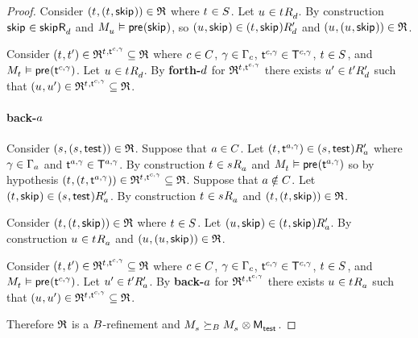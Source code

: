 \begin{proof}
Consider $(\kStateT, (\kStateT, \aStateSkip)) \in \refinement$ where $\kStateT \in \kStates$.
Let $\kStateU \in \kSuccessorsD{\kStateT}$.
By construction $\aStateSkip \in \aSuccessorsD{\aStateSkip}$ and $\kPModel{\kStateU} \entails \aPrecondition(\aStateSkip)$, so $(\kStateU, \aStateSkip) \in \kSuccessorsPD{(\kStateT, \aStateSkip)}$ and $(\kStateU, (\kStateU, \aStateSkip)) \in \refinement$.

Consider $(\kStateT, \kStateTP) \in \refinement^{\kStateT, \aStateT[\agentC, \gamma]} \subseteq \refinement$ where $\agentC \in \agentsC$, $\gamma \in \Gamma_\agentC$, $\aStateT[\agentC, \gamma] \in \aStatesT[\agentC, \gamma]$, $\kStateT \in \kStates$, and $\kPModel{\kStateT} \entails \aPrecondition(\aStateT[\agentC, \gamma])$.
Let $\kStateU \in \kSuccessorsD{\kStateT}$.
By {\bf forth-$\agentD$} for $\refinement^{\kStateT, \aStateT[\agentC, \gamma]}$ there exists $\kStateUP \in \kSuccessorsPD{\kStateTP}$ such that $(\kStateU, \kStateUP) \in \refinement^{\kStateT, \aStateT[\agentC, \gamma]} \subseteq \refinement$.

\paragraph{back-$\agentA$}
Consider $(\kStateS, (\kStateS, \aStateTest)) \in \refinement$.
Suppose that $\agentA \in \agentsC$.
Let $(\kStateT, \aStateT[\agentA, \gamma]) \in \kSuccessorsPA{(\kStateS, \aStateTest)}$ where $\gamma \in \Gamma_\agentA$ and $\aStateT[\agentA, \gamma] \in \aStatesT[\agentA, \gamma]$.
By construction $\kStateT \in \kSuccessorsA{\kStateS}$ and $\kPModel{\kStateT} \entails \aPrecondition(\aStateT[\agentA, \gamma])$ so by hypothesis $(\kStateT, (\kStateT, \aStateT[\agentA, \gamma])) \in \refinement^{\kStateT, \aStateT[\agentC, \gamma]} \subseteq \refinement$.
Suppose that $\agentA \notin \agentsC$.
Let $(\kStateT, \aStateSkip) \in \kSuccessorsPA{(\kStateS, \aStateTest)}$.
By construction $\kStateT \in \kSuccessorsA{\kStateS}$ and $(\kStateT, (\kStateT, \aStateSkip)) \in \refinement$.

Consider $(\kStateT, (\kStateT, \aStateSkip)) \in \refinement$ where $\kStateT \in \kStates$.
Let $(\kStateU, \aStateSkip) \in \kSuccessorsPA{(\kStateT, \aStateSkip)}$.
By construction $\kStateU \in \kSuccessorsA{\kStateT}$ and $(\kStateU, (\kStateU, \aStateSkip)) \in \refinement$.

Consider $(\kStateT, \kStateTP) \in \refinement^{\kStateT, \aStateT[\agentC, \gamma]} \subseteq \refinement$ where $\agentC \in \agentsC$, $\gamma \in \Gamma_\agentC$, $\aStateT[\agentC, \gamma] \in \aStatesT[\agentC, \gamma]$, $\kStateT \in \kStates$, and $\kPModel{\kStateT} \entails \aPrecondition(\aStateT[\agentC, \gamma])$.
Let $\kStateUP \in \kSuccessorsPA{\kStateTP}$.
By {\bf back-$\agentA$} for $\refinement^{\kStateT, \aStateT[\agentC, \gamma]}$ there exists $\kStateU \in \kSuccessorsA{\kStateT}$ such that $(\kStateU, \kStateUP) \in \refinement^{\kStateT, \aStateT[\agentC, \gamma]} \subseteq \refinement$.

Therefore $\refinement$ is a $\agentsB$-refinement and $\kPModel{\kStateS} \simulatesBs \kPModel{\kStateS} \exec \aPModel{\aStateTest}$.

\end{proof}

